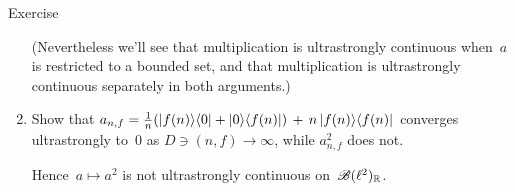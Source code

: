 \documentclass[a]{subfiles}
\begin{document}
\begin{parsec}
\begin{point}{Exercise}
\begin{enumerate}
(Nevertheless we'll see that multiplication is ultrastrongly continuous
when~$a$ is restricted to a bounded set,
and that multiplication is ultrastrongly continuous
separately in both arguments.)

\item
Show that
$a_{n,f} = \frac{1}{n}(\left|f(n)\right>\!\left<0\right|+\left|0\right>\!\left<f(n)\right|)
\,+\, n\left|f(n)\right>\!\left<f(n)\right|$
converges ultrastrongly to~$0$
as $D\ni(n,f)\to\infty$,
while $a_{n,f}^2$ does not.

Hence~$a\mapsto a^2$ is not ultrastrongly continuous on~$\mathscr{B}(\ell^2)_{\mathbb{R}}$.

\end{enumerate}
\end{point}
\end{parsec}
%
%
\end{document}

